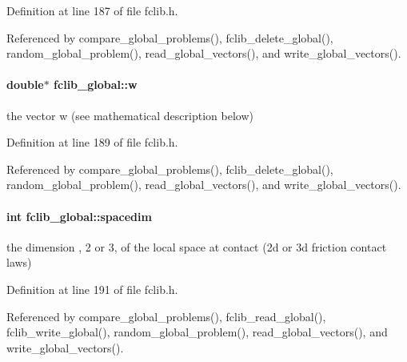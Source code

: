 Definition at line 187 of file fclib.\+h.



Referenced by compare\+\_\+global\+\_\+problems(), fclib\+\_\+delete\+\_\+global(), random\+\_\+global\+\_\+problem(), read\+\_\+global\+\_\+vectors(), and write\+\_\+global\+\_\+vectors().

\hypertarget{structfclib__global_a8b175716b6c1f84509cf44b36a76e7ca}{}
\paragraph[{w}]{\setlength{\rightskip}{0pt plus 5cm}double$\ast$ fclib\+\_\+global\+::w}\label{structfclib__global_a8b175716b6c1f84509cf44b36a76e7ca}


the vector w (see mathematical description below) 



Definition at line 189 of file fclib.\+h.



Referenced by compare\+\_\+global\+\_\+problems(), fclib\+\_\+delete\+\_\+global(), random\+\_\+global\+\_\+problem(), read\+\_\+global\+\_\+vectors(), and write\+\_\+global\+\_\+vectors().

\hypertarget{structfclib__global_a86dac5928d2c652f15ac688df14989a0}{}
\paragraph[{spacedim}]{\setlength{\rightskip}{0pt plus 5cm}int fclib\+\_\+global\+::spacedim}\label{structfclib__global_a86dac5928d2c652f15ac688df14989a0}


the dimension , 2 or 3, of the local space at contact (2d or 3d friction contact laws) 



Definition at line 191 of file fclib.\+h.



Referenced by compare\+\_\+global\+\_\+problems(), fclib\+\_\+read\+\_\+global(), fclib\+\_\+write\+\_\+global(), random\+\_\+global\+\_\+problem(), read\+\_\+global\+\_\+vectors(), and write\+\_\+global\+\_\+vectors().

\hypertarget{structfclib__global_aa6b4e80afc92dd1a9b260ff3a096b352}{}
